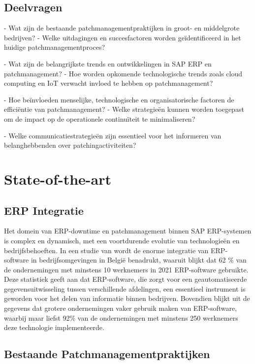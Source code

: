 \subsection{Deelvragen}
- Wat zijn de bestaande patchmanagementpraktijken in groot- en middelgrote bedrijven?
- Welke uitdagingen en succesfactoren worden geïdentificeerd in het huidige patchmanagementproces?

- Wat zijn de belangrijkste trends en ontwikkelingen in SAP ERP en patchmanagement?
- Hoe worden opkomende technologische trends zoals cloud computing en IoT verwacht invloed te hebben op patchmanagement?

- Hoe beïnvloeden menselijke, technologische en organisatorische factoren de efficiëntie van patchmanagement?
- Welke strategieën kunnen worden toegepast om de impact op de operationele continuïteit te minimaliseren?

- Welke communicatiestrategieën zijn essentieel voor het informeren van belanghebbenden over patchingactiviteiten?



\section{State-of-the-art}%
\label{sec:state-of-the-art}

\subsection{ERP Integratie}
Het domein van ERP-downtime en patchmanagement binnen SAP ERP-systemen is complex en dynamisch, met een voortdurende evolutie van technologieën en bedrijfsbehoeften. In een studie van \autocite{StatistiekVlaanderen2022} wordt de enorme integratie van ERP-software in bedrijfsomgevingen in België benadrukt, waaruit blijkt dat 62 \% van de ondernemingen met minstens 10 werknemers in 2021 ERP-software gebruikte. Deze statistiek geeft aan dat ERP-software, die zorgt voor een geautomatiseerde gegevensuitwisseling tussen verschillende afdelingen, een essentieel instrument is geworden voor het delen van informatie binnen bedrijven. Bovendien blijkt uit de gegevens dat grotere ondernemingen vaker gebruik maken van ERP-software, waarbij maar liefst 92\% van de ondernemingen met minstens 250 werknemers deze technologie implementeerde.

\subsection{Bestaande Patchmanagementpraktijken}


